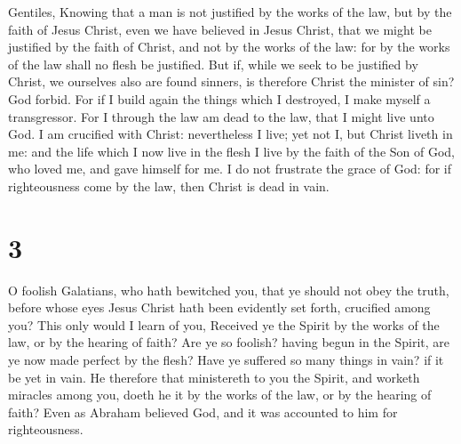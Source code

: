 Gentiles,  Knowing that a man is not justified by the
works of the law, but by the faith of Jesus Christ, even we have
believed in Jesus Christ, that we might be justified by the faith of
Christ, and not by the works of the law: for by the works of the law
shall no flesh be justified.  But if, while we seek to be
justified by Christ, we ourselves also are found sinners, is therefore
Christ the minister of sin? God forbid.  For if I build
again the things which I destroyed, I make myself a transgressor.
 For I through the law am dead to the law, that I might
live unto God.  I am crucified with Christ: nevertheless
I live; yet not I, but Christ liveth in me: and the life which I now
live in the flesh I live by the faith of the Son of God, who loved me,
and gave himself for me.  I do not frustrate the grace of
God: for if righteousness come by the law, then Christ is dead in vain.

\hypertarget{section-2}{%
\section{3}\label{section-2}}

 O foolish Galatians, who hath bewitched you, that ye
should not obey the truth, before whose eyes Jesus Christ hath been
evidently set forth, crucified among you?  This only would
I learn of you, Received ye the Spirit by the works of the law, or by
the hearing of faith?  Are ye so foolish? having begun in
the Spirit, are ye now made perfect by the flesh?  Have ye
suffered so many things in vain? if it be yet in vain.  He
therefore that ministereth to you the Spirit, and worketh miracles among
you, doeth he it by the works of the law, or by the hearing of faith?
 Even as Abraham believed God, and it was accounted to him
for righteousness.

